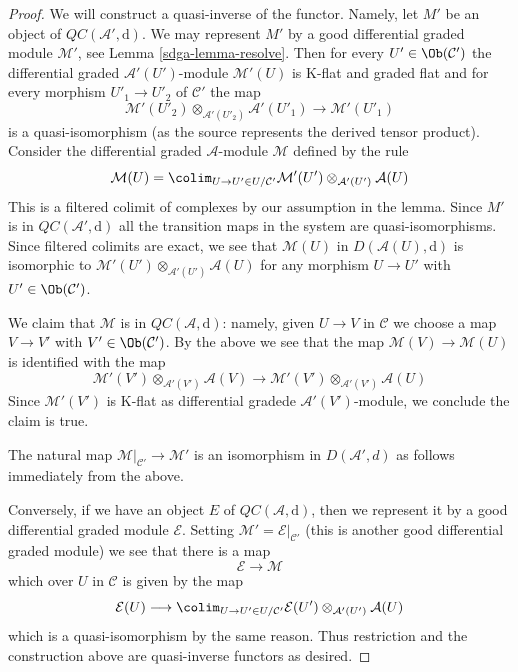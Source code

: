 \begin{proof}

We will construct a quasi-inverse of the functor. Namely,
let $M'$ be an object of $\mathit{QC}(\mathcal{A}', \text{d})$.
We may represent $M'$ by a good differential graded module $\mathcal{M}'$,
see Lemma \ref{sdga-lemma-resolve}. Then for every $U' \in \Ob(\mathcal{C}')$
the differential graded $\mathcal{A}'(U')$-module $\mathcal{M}'(U)$
is K-flat and graded flat and for every morphism $U'_1 \to U'_2$ of
$\mathcal{C}'$ the map
$$
\mathcal{M}'(U'_2) \otimes_{\mathcal{A}'(U'_2)} \mathcal{A}'(U'_1)
\longrightarrow
\mathcal{M}'(U'_1)
$$
is a quasi-isomorphism (as the source represents the derived tensor product).
Consider the differential graded
$\mathcal{A}$-module $\mathcal{M}$ defined by the rule
$$
\mathcal{M}(U) =
\colim_{U \to U' \in U/\mathcal{C}'}
\mathcal{M}'(U') \otimes_{\mathcal{A}'(U')} \mathcal{A}(U)
$$
This is a filtered colimit of complexes by our assumption in the lemma.
Since $M'$ is in $\mathit{QC}(\mathcal{A}', \text{d})$ all the
transition maps in the system are quasi-isomorphisms. Since filtered
colimits are exact, we see that
$\mathcal{M}(U)$ in $D(\mathcal{A}(U), \text{d})$
is isomorphic to $\mathcal{M}'(U') \otimes_{\mathcal{A}'(U')} \mathcal{A}(U)$
for any morphism $U \to U'$ with $U' \in \Ob(\mathcal{C}')$.

\medskip\noindent
We claim that $\mathcal{M}$ is in
$\mathit{QC}(\mathcal{A}, \text{d})$: namely, given $U \to V$ in
$\mathcal{C}$ we choose a map $V \to V'$ with $V' \in \Ob(\mathcal{C}')$.
By the above we see that the map $\mathcal{M}(V) \to \mathcal{M}(U)$
is identified with the map
$$
\mathcal{M}'(V') \otimes_{\mathcal{A}'(V')} \mathcal{A}(V)
\longrightarrow
\mathcal{M}'(V') \otimes_{\mathcal{A}'(V')} \mathcal{A}(U)
$$
Since $\mathcal{M'}(V')$ is K-flat as
differential gradede $\mathcal{A}'(V')$-module, we conclude
the claim is true.

\medskip\noindent
The natural map $\mathcal{M}|_{\mathcal{C}'} \to \mathcal{M}'$ is an
isomorphism in $D(\mathcal{A}', d)$ as follows immediately from the above.

\medskip\noindent
Conversely, if we have an object $E$ of $\mathit{QC}(\mathcal{A}, \text{d})$,
then we represent it by a good differential graded module $\mathcal{E}$.
Setting $\mathcal{M}' = \mathcal{E}|_{\mathcal{C}'}$ (this is another good
differential graded module) we see that there is a map
$$
\mathcal{E} \to \mathcal{M}
$$
which over $U$ in $\mathcal{C}$ is given by the map
$$
\mathcal{E}(U)
\longrightarrow
\colim_{U \to U' \in U/\mathcal{C}'}
\mathcal{E}(U') \otimes_{\mathcal{A}'(U')} \mathcal{A}(U)
$$
which is a quasi-isomorphism by the same reason. Thus restriction and
the construction above are quasi-inverse functors as desired.
\end{proof}

